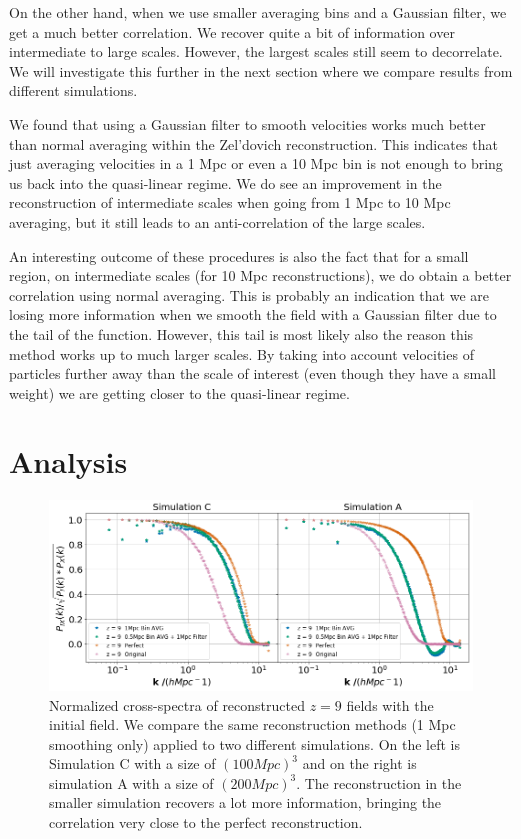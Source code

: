 On the other hand, when we use smaller averaging bins and a Gaussian filter, we get a much better correlation. We recover quite a bit of information over intermediate to large scales. However, the largest scales still seem to decorrelate. We will investigate this further in the next section where we compare results from different simulations. 

We found that using a Gaussian filter to smooth velocities works much better than normal averaging within the Zel'dovich reconstruction. This indicates that just averaging velocities in a 1 Mpc or even a 10 Mpc bin is not enough to bring us back into the quasi-linear regime. We do see an improvement in the reconstruction of intermediate scales when going from 1 Mpc to 10 Mpc averaging, but it still leads to an anti-correlation of the large scales.

An interesting outcome of these procedures is also the fact that for a small region, on intermediate scales (for 10 Mpc reconstructions), we do obtain a better correlation using normal averaging. This is probably an indication that we are losing more information when we smooth the field with a Gaussian filter due to the tail of the function. However, this tail is most likely also the reason this method works up to much larger scales. By taking into account velocities of particles further away than the scale of interest (even though they have a small weight) we are getting closer to the quasi-linear regime. 

\section{Analysis}

\begin{figure}
    \centering
    \includegraphics[width=1\columnwidth]{images/realRecon/z9SimComp.png}%
    
    \caption{
        Normalized cross-spectra of reconstructed $z=9$ fields with the initial field. We compare the same reconstruction methods (1 Mpc smoothing only) applied to two different simulations. On the left is Simulation C with a size of $(100 Mpc)^3$ and on the right is simulation A with a size of $(200 Mpc)^3$. The reconstruction in the smaller simulation recovers a lot more information, bringing the correlation very close to the perfect reconstruction.
        }
        
        \label{fig:4.4}
    \end{figure}
    
